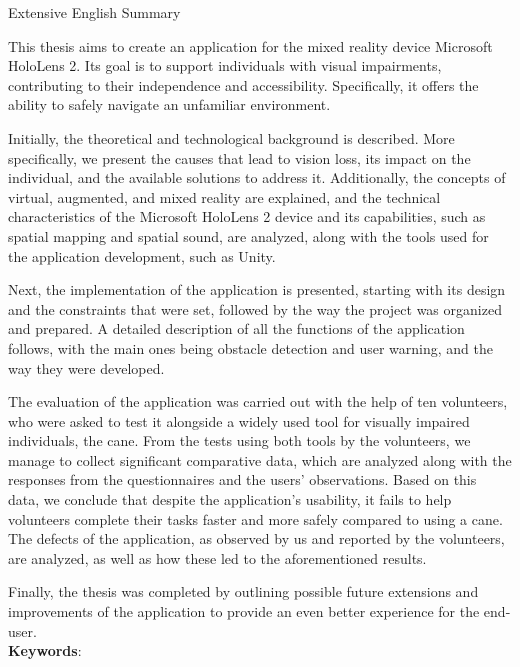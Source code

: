 \pagestyle{plain}
\begin{center}
{\LARGE Extensive English Summary}\\[1cm]
\end{center}

\setlength{\parindent}{0pt}
This thesis aims to create an application for the mixed reality device Microsoft HoloLens 2. Its goal is to support individuals with visual impairments, contributing to their independence and accessibility. Specifically, it offers the ability to safely navigate an unfamiliar environment.

Initially, the theoretical and technological background is described. More specifically, we present the causes that lead to vision loss, its impact on the individual, and the available solutions to address it. Additionally, the concepts of virtual, augmented, and mixed reality are explained, and the technical characteristics of the Microsoft HoloLens 2 device and its capabilities, such as spatial mapping and spatial sound, are analyzed, along with the tools used for the application development, such as Unity.

Next, the implementation of the application is presented, starting with its design and the constraints that were set, followed by the way the project was organized and prepared. A detailed description of all the functions of the application follows, with the main ones being obstacle detection and user warning, and the way they were developed.

The evaluation of the application was carried out with the help of ten volunteers, who were asked to test it alongside a widely used tool for visually impaired individuals, the cane. From the tests using both tools by the volunteers, we manage to collect significant comparative data, which are analyzed along with the responses from the questionnaires and the users' observations. Based on this data, we conclude that despite the application's usability, it fails to help volunteers complete their tasks faster and more safely compared to using a cane. The defects of the application, as observed by us and reported by the volunteers, are analyzed, as well as how these led to the aforementioned results.

Finally, the thesis was completed by outlining possible future extensions and improvements of the application to provide an even better experience for the end-user.
\\[\baselineskip]
\textbf{Keywords}: {\keywordsEnglish}